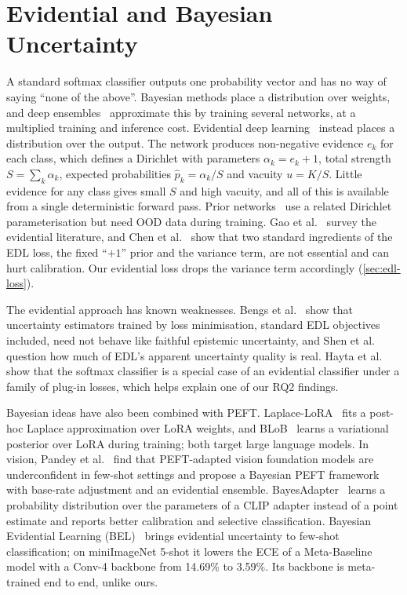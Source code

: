 \section{Evidential and Bayesian Uncertainty}

A standard softmax classifier outputs one probability vector and has no way of saying ``none of the
above''. Bayesian methods place a distribution over weights, and deep
ensembles~\cite{lakshminarayanan2017ensembles} approximate this by training several networks, at a
multiplied training and inference cost. Evidential deep learning~\cite{sensoy2018edl} instead places a
distribution over the output. The network produces non-negative evidence $e_k$ for each class, which
defines a Dirichlet with parameters $\alpha_k = e_k + 1$, total strength $S = \sum_k \alpha_k$,
expected probabilities $\hat p_k = \alpha_k / S$ and vacuity $u = K/S$. Little evidence for any class
gives small $S$ and high vacuity, and all of this is available from a single deterministic forward
pass. Prior networks~\cite{malinin2018prior} use a related Dirichlet parameterisation but need OOD data
during training. Gao et al.~\cite{gao2024edlsurvey} survey the evidential literature, and Chen et
al.~\cite{chen2024redl} show that two standard ingredients of the EDL loss, the fixed ``$+1$'' prior and
the variance term, are not essential and can hurt calibration. Our evidential loss drops the variance
term accordingly (\cref{sec:edl-loss}).

The evidential approach has known weaknesses. Bengs et al.~\cite{bengs2022pitfalls} show that
uncertainty estimators trained by loss minimisation, standard EDL objectives included, need not behave
like faithful epistemic uncertainty, and Shen et al.~\cite{shen2024mirage} question how much of EDL's
apparent uncertainty quality is real. Hayta et al.~\cite{hayta2026plugin} show that the softmax
classifier is a special case of an evidential classifier under a family of plug-in losses, which helps
explain one of our RQ2 findings.

Bayesian ideas have also been combined with PEFT. Laplace-LoRA~\cite{yang2024laplacelora} fits a
post-hoc Laplace approximation over LoRA weights, and BLoB~\cite{wang2024blob} learns a variational
posterior over LoRA during training; both target large language models. In vision, Pandey et
al.~\cite{pandey2024bayesianpeft} find that PEFT-adapted vision foundation models are underconfident in
few-shot settings and propose a Bayesian PEFT framework with base-rate adjustment and an evidential
ensemble. BayesAdapter~\cite{moralesalvarez2026bayesadapter} learns a probability distribution over the
parameters of a CLIP adapter instead of a point estimate and reports better calibration and selective
classification. Bayesian Evidential Learning
(BEL)~\cite{linghu2022bel} brings evidential uncertainty to few-shot classification; on miniImageNet
5-shot it lowers the ECE of a Meta-Baseline model with a Conv-4 backbone from 14.69\% to 3.59\%. Its
backbone is meta-trained end to end, unlike ours.

